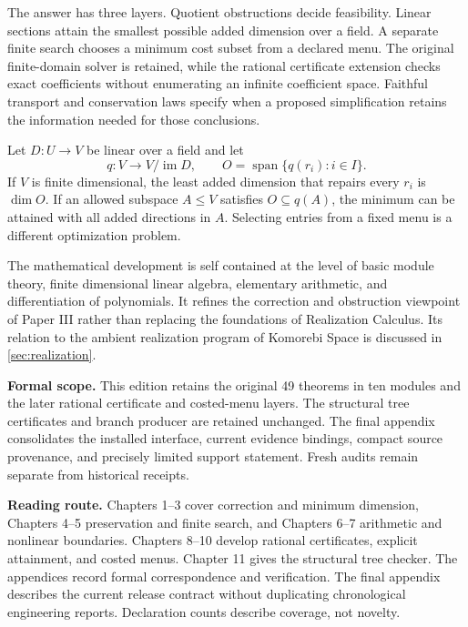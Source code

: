 \documentclass[11pt,letterpaper,oneside,openany]{book}
\theoremstyle{quiet}
\DeclareMathOperator{\im}{im}
\DeclareMathOperator{\Span}{span}
\begin{document}
The answer has three layers. Quotient obstructions decide feasibility. Linear sections attain the smallest possible added dimension over a field. A separate finite search chooses a minimum cost subset from a declared menu. The original finite-domain solver is retained, while the rational certificate extension checks exact coefficients without enumerating an infinite coefficient space. Faithful transport and conservation laws specify when a proposed simplification retains the information needed for those conclusions.

\begin{scopebox}[title=The central result]
Let $D:U\to V$ be linear over a field and let
\[
q:V\to V/\im D,\qquad O=\Span\{q(r_i):i\in I\}.
\]
If $V$ is finite dimensional, the least added dimension that repairs every $r_i$ is $\dim O$. If an allowed subspace $A\leq V$ satisfies $O\subseteq q(A)$, the minimum can be attained with all added directions in $A$. Selecting entries from a fixed menu is a different optimization problem.
\end{scopebox}

The mathematical development is self contained at the level of basic module theory, finite dimensional linear algebra, elementary arithmetic, and differentiation of polynomials. It refines the correction and obstruction viewpoint of Paper III rather than replacing the foundations of Realization Calculus. Its relation to the ambient realization program of Komorebi Space is discussed in \cref{sec:realization}.

\textbf{Formal scope.} This edition retains the original 49 theorems in ten modules and the later rational certificate and costed-menu layers. The structural tree certificates and branch producer are retained unchanged. The final appendix consolidates the installed interface, current evidence bindings, compact source provenance, and precisely limited support statement. Fresh audits remain separate from historical receipts.

\textbf{Reading route.} Chapters 1--3 cover correction and minimum dimension, Chapters 4--5 preservation and finite search, and Chapters 6--7 arithmetic and nonlinear boundaries. Chapters 8--10 develop rational certificates, explicit attainment, and costed menus. Chapter 11 gives the structural tree checker. The appendices record formal correspondence and verification. The final appendix describes the current release contract without duplicating chronological engineering reports. Declaration counts describe coverage, not novelty.
\end{document}
